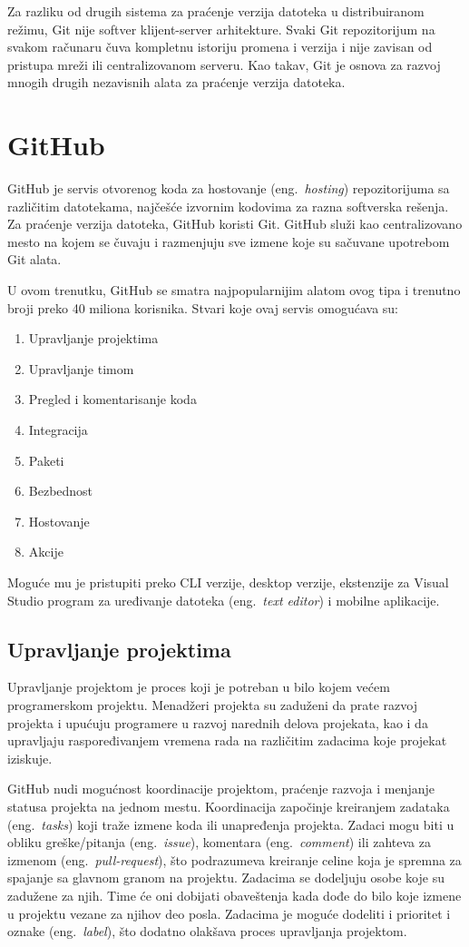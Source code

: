 \documentclass[12pt]{report}
\begin{document}
Za razliku od drugih sistema za praćenje verzija datoteka u distribuiranom režimu, Git nije softver klijent-server arhitekture. Svaki Git repozitorijum na svakom računaru čuva kompletnu istoriju promena i verzija i nije zavisan od pristupa mreži ili centralizovanom serveru. Kao takav, Git je osnova za razvoj mnogih drugih nezavisnih alata za praćenje verzija datoteka.

\section{GitHub}
GitHub \cite{github} je servis otvorenog koda za hostovanje (eng.\ \textit{hosting}) repozitorijuma sa različitim datotekama, najčešće izvornim kodovima za razna softverska rešenja. Za praćenje verzija datoteka, GitHub koristi Git. GitHub služi kao centralizovano mesto na kojem se čuvaju i razmenjuju sve izmene koje su sačuvane upotrebom Git alata.

U ovom trenutku, GitHub se smatra najpopularnijim alatom ovog tipa i trenutno broji preko 40 miliona korisnika. Stvari koje ovaj servis omogućava su:

\begin{enumerate}
    \item Upravljanje projektima
    \item Upravljanje timom
    \item Pregled i komentarisanje koda
    \item Integracija
    \item Paketi
    \item Bezbednost
    \item Hostovanje
    \item Akcije
\end{enumerate}

Moguće mu je pristupiti preko CLI verzije, desktop verzije, ekstenzije za Visual Studio program za uređivanje datoteka (eng.\ \textit{text editor}) i mobilne aplikacije.

\subsection{Upravljanje projektima}
Upravljanje projektom je proces koji je potreban u bilo kojem većem programerskom projektu. Menadžeri projekta su zaduženi da prate razvoj projekta i upućuju programere u razvoj narednih delova projekata, kao i da upravljaju raspoređivanjem vremena rada na različitim zadacima koje projekat iziskuje.

GitHub nudi mogućnost koordinacije projektom, praćenje razvoja i menjanje statusa projekta na jednom mestu. Koordinacija započinje kreiranjem zadataka (eng.\ \textit{tasks}) koji traže izmene koda ili unapređenja projekta. Zadaci mogu biti u obliku greške/pitanja (eng.\ \textit{issue}), komentara (eng.\ \textit{comment}) ili zahteva za izmenom (eng.\ \textit{pull-request}), što podrazumeva kreiranje celine koja je spremna za spajanje sa glavnom granom na projektu. Zadacima se dodeljuju osobe koje su zadužene za njih. Time će oni dobijati obaveštenja kada dođe do bilo koje izmene u projektu vezane za njihov deo posla. Zadacima je moguće dodeliti i prioritet i oznake (eng.\ \textit{label}), što dodatno olakšava proces upravljanja projektom.
\end{document}
